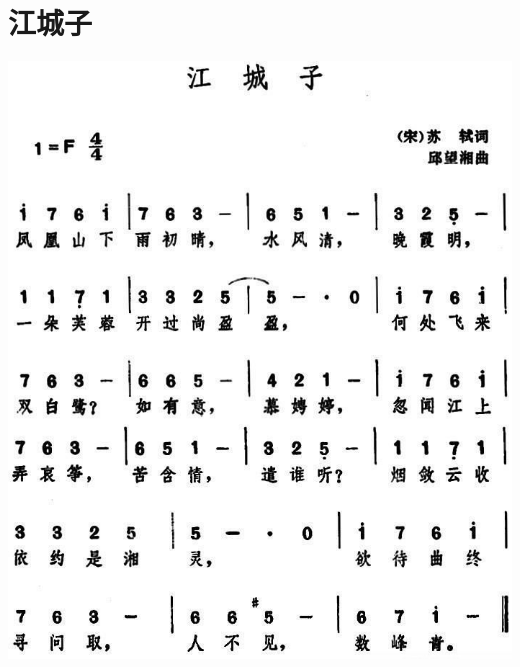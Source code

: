 \documentclass[cn,pad,chinesefont=nofont,twocol]{elegantbook}
\begin{document}
\section{江城子}
    \includegraphics[width=\textwidth]{dongxiao/20200627-苏轼-江城子.jpg} 
\end{document}
